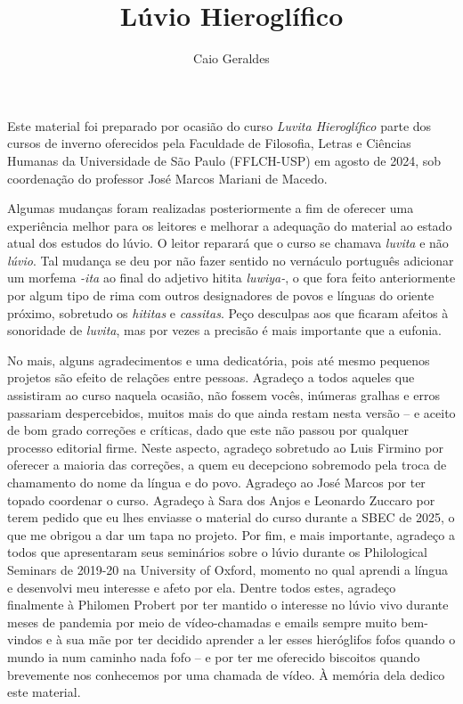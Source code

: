 \documentclass{luviolivro}
\title{Lúvio Hieroglífico}
\author{Caio Geraldes}
\begin{document}
\frontmatter

\thetitlepage%


\cleardoublepage%


\cleardoublepage%
\tableofcontents*

\cleardoublepage%
\listoffigures*



Este material foi preparado por ocasião do curso \emph{Luvita Hieroglífico}
parte dos cursos de inverno oferecidos pela Faculdade de Filosofia, Letras e
Ciências Humanas da Universidade de São Paulo (FFLCH-USP) em agosto de 2024, sob
coordenação do professor José Marcos Mariani de Macedo.

Algumas mudanças foram realizadas posteriormente a fim de oferecer uma
experiência melhor para os leitores e melhorar a adequação do material ao estado
atual dos estudos do lúvio.
O leitor reparará que o curso se chamava \emph{luvita} e não \emph{lúvio}.
Tal mudança se deu por não fazer sentido no vernáculo português adicionar um
morfema \emph{-ita} ao final do adjetivo hitita \emph{luwiya-}, o que fora feito
anteriormente por algum tipo de rima com outros designadores de povos e línguas
do oriente próximo, sobretudo os \emph{hititas} e \emph{cassitas}.
Peço desculpas aos que ficaram afeitos à sonoridade de \emph{luvita}, mas por
vezes a precisão é mais importante que a eufonia.

No mais, alguns agradecimentos e uma dedicatória, pois até mesmo pequenos
projetos são efeito de relações entre pessoas.
Agradeço a todos aqueles que assistiram ao curso naquela ocasião, não
fossem vocês, inúmeras gralhas e erros passariam despercebidos, muitos mais do
que ainda restam nesta versão -- e aceito de bom grado correções e críticas,
dado que este não passou por qualquer processo editorial firme.
Neste aspecto, agradeço sobretudo ao Luis Firmino por oferecer a maioria das
correções, a quem eu decepciono sobremodo pela troca de chamamento do nome da
língua e do povo.
Agradeço ao José Marcos por ter topado coordenar o curso.
Agradeço à Sara dos Anjos e Leonardo Zuccaro por terem pedido que eu lhes enviasse o
material do curso durante a SBEC de 2025, o que me obrigou a dar um tapa no
projeto.
Por fim, e mais importante, agradeço a todos que apresentaram seus seminários
sobre o lúvio durante os Philological Seminars de 2019-20 na University of
Oxford, momento no qual aprendi a língua e desenvolvi meu interesse e afeto por
ela.
Dentre todos estes, agradeço finalmente à Philomen Probert por ter mantido o
interesse no lúvio vivo durante meses de pandemia por meio de vídeo-chamadas e
emails sempre muito bem-vindos e à sua mãe por ter decidido aprender a ler esses
hieróglifos fofos quando o mundo ia num caminho nada fofo -- e por ter me oferecido
biscoitos quando brevemente nos conhecemos por uma chamada de vídeo.
À memória dela dedico este material.
\end{document}
